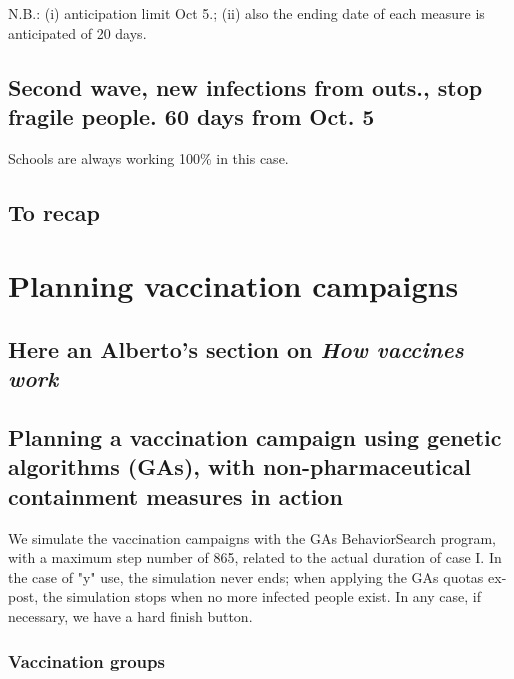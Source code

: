 \documentclass[graybox]{svmult}
\begin{document}
N.B.: (i) anticipation limit Oct 5.; (ii) also the ending date of each measure is anticipated of 20 days.

\subsection{Second wave, new infections from outs., stop fragile people. 60  days from Oct. 5}
\label{frag}


Schools are always working 100\% in this case.

\subsection{To recap}
\label{recap}

\section{Planning vaccination campaigns}
\label{planning}

\subsection{Here an Alberto's section on \emph{How vaccines work}}
\label{vaccineAction}

\subsection{Planning a vaccination campaign using genetic algorithms (GAs), with non-pharmaceutical containment measures in action}
\label{planGA}

We simulate the vaccination campaigns with the GAs BehaviorSearch program, with a maximum step number of 865, related to the actual duration of case I. In the case of "y" use, the simulation never ends; when applying the GAs quotas ex-post, the simulation stops when no more infected people exist. In any case, if necessary, we have a hard finish button.

\subsubsection{Vaccination groups}
\label{vgroups}
\end{document}
